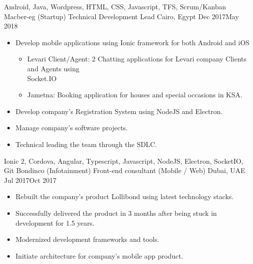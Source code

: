\begin{experiences}
{\begin{itemize}
                \end{itemize}
            }
            {Android, Java, Wordpress, HTML, CSS, Javascript, TFS, Scrum/Kanban}
    \emptySeparator
    \experience
        {Macber-eg (Startup)}   {Technical Development Lead}
        {Cairo, Egypt}
        {Dec 2017}{May 2018}
            {
                \begin{itemize}
                    \item Develop mobile applications using Ionic framework for both
                    Android and iOS
                    \begin{itemize}
                        \item Levari Client/Agent: 2 Chatting applications for Levari
                        company Clients and Agents using \\Socket.IO                
                        \item  Jametna: Booking application for houses and special
                        occasions in KSA. 
                    \end{itemize}
                    \item Develop company's Registration System using NodeJS and Electron.                          
                    \item Manage company’s software projects.                                                      
                    \item Technical leading the team through the SDLC.
                \end{itemize}
            }
            {Ionic 2, Cordova, Angular, Typescript, Javascript, NodeJS, Electron,
            SocketIO, Git}
    \emptySeparator
    \experience
        {Bondinco (Infotainment)}   {Front-end consultant (Mobile / Web)}
        {Dubai, UAE}
        {Jul 2017}{Oct 2017}
        {
            \begin{itemize}
                \item Rebuilt the company’s product Lollibond using latest technology
                stacks.                               
                \item Successfully delivered the product in 3 months after being stuck in development for 1.5 years.            
                \item Modernized development frameworks and tools.
                \item Initiate architecture for company’s mobile app product.

\end{itemize}}
\end{experiences}
